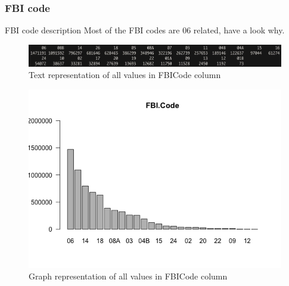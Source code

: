 \newpage
\subsubsection{FBI code}
FBI code description
Most of the FBI codes are 06 related, have a look why.
\begin{figure}[H]
\includegraphics[scale=0.4]{images/EDA/FBICode.jpg}
\centering
\caption{Text representation of all values in FBICode column}
\end{figure}
\begin{figure}[H]
\includegraphics[scale=0.7]{images/EDA/FBICode.png}
\centering
\caption{Graph representation of all values in FBICode column}
\end{figure}